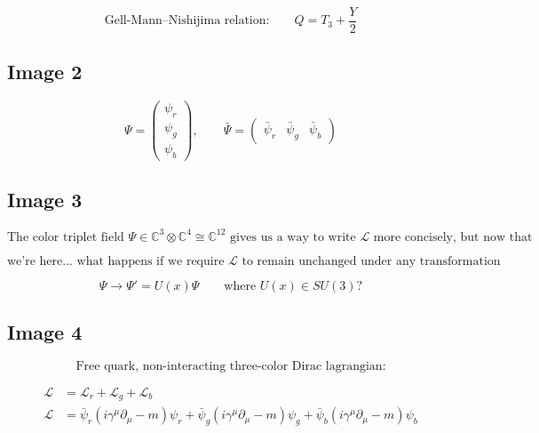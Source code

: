\documentclass[11pt]{article}
\begin{document}
        \[
            \text{Gell-Mann--Nishijima relation:}
            \qquad
            Q = T_3 + \frac{Y}{2}
        \]
    
    \subsection*{Image 2}
        \[
            \Psi =
            \begin{pmatrix}
                \psi_r \\
                \psi_g \\
                \psi_b
            \end{pmatrix},
            \qquad
            \bar{\Psi} =
            \begin{pmatrix}
                \bar{\psi}_r & \bar{\psi}_g & \bar{\psi}_b
            \end{pmatrix}
        \]
    
    \subsection*{Image 3}
        \[
            \text{The color triplet field } \Psi \in \mathbb{C}^3 \otimes \mathbb{C}^4 \cong \mathbb{C}^{12}
            \text{ gives us a way to write } \mathcal{L} \text{ more concisely, but now that}
        \]
        
        \[
            \text{we're here... what happens if we require } \mathcal{L}
            \text{ to remain unchanged under any transformation}
        \]
        
        \[
            \Psi \to \Psi' = U(x)\Psi
            \qquad
            \text{where } U(x) \in SU(3)\text{?}
        \]
    
    \subsection*{Image 4}
        \[
            \text{Free quark, non-interacting three-color Dirac lagrangian:}
        \]
        
        \begin{align*}
            \mathcal{L} &= \mathcal{L}_r + \mathcal{L}_g + \mathcal{L}_b \\
            \mathcal{L}
            &= \bar{\psi}_r \left(i\gamma^\mu \partial_\mu - m\right)\psi_r
            + \bar{\psi}_g \left(i\gamma^\mu \partial_\mu - m\right)\psi_g
            + \bar{\psi}_b \left(i\gamma^\mu \partial_\mu - m\right)\psi_b
        \end{align*}
        
\end{document}
